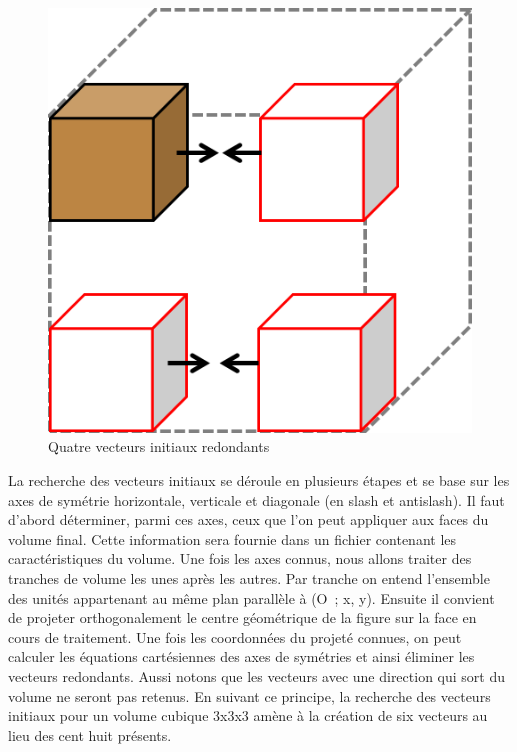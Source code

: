 \begin{figure}[h]
 \centering
 \includegraphics[scale=0.5,keepaspectratio=true]{img/startingPoint.png}
 \caption{Quatre vecteurs initiaux redondants}
 \label{startingPoint}
\end{figure}

La recherche des vecteurs initiaux se déroule en plusieurs étapes et se base sur les axes de symétrie horizontale, verticale et diagonale (en slash et antislash). Il faut d’abord déterminer, parmi ces axes, ceux que l’on peut appliquer aux faces du volume final. Cette information sera fournie dans un fichier contenant les caractéristiques du volume. Une fois les axes connus, nous allons traiter des tranches de volume les unes après les autres. Par tranche on entend l’ensemble des unités appartenant au même plan parallèle à (O ; x, y). Ensuite il convient de projeter orthogonalement le centre géométrique de la figure sur la face en cours de traitement. Une fois les coordonnées du projeté connues, on peut calculer les équations cartésiennes des axes de symétries et ainsi éliminer les vecteurs redondants. Aussi notons que les vecteurs avec une direction qui sort du volume ne seront pas retenus. En suivant ce principe, la recherche des vecteurs initiaux pour un volume cubique 3x3x3 amène à la création de six vecteurs au lieu des cent huit présents.
